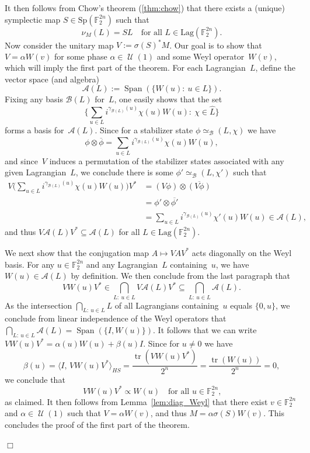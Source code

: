 \documentclass[11pt]{amsart}
\newcommand{\Lag}{\mathrm{Lag}}
\newcommand{\F}{\mathbb{F}} %
\DeclareMathOperator{\vspan}{Span} %
\newcommand{\Sp}{\mathrm{Sp}}
\DeclareMathOperator{\U}{\mathcal{U}}
\DeclareMathOperator{\tr}{tr}
\newcommand{\A}{\mathcal A}
\newcommand{\B}{\mathcal B}
\theoremstyle{plain}
\theoremstyle{definition}
\theoremstyle{remark}
\renewenvironment{proof}[1][]{
    	\begin{trivlist}
     	\item[\hspace{\labelsep}{\em\noindent Proof#1:\/}]}
     	{{\hfill$\Box$}
    	\end{trivlist}
  }
\begin{document}
\begin{proof}
It then follows from Chow's theorem (\cref{thm:chow}) that there exists a (unique) symplectic map $S\in \Sp(\F_2^{2n})$ such that
$$\nu_M(L) = SL \quad \text{for all $L\in \Lag(\F_2^{2n})$.}$$
Now consider the unitary map $V := \sigma(S)^* M$.
Our goal is to show that $V = \alpha W(v)$ for some phase $\alpha\in \U(1)$ and some Weyl operator~$W(v)$, which will imply the first part of the theorem. For each Lagrangian~$L$, define the vector space (and algebra)
$$\A(L) := \vspan(\{W(u):\: u\in L\}).$$
Fixing any basis $\B(L)$ for~$L$, one easily shows that the set
$$\bigg\{\sum_{u\in L} i^{\gamma_{\B(L)}(u)} \chi(u) W(u):\: \chi \in \widehat{L}\bigg\}$$
forms a basis for~$\A(L)$.
Since for a stabilizer state $\phi \simeq_\B (L, \chi)$ we have
$$\phi \otimes \overline{\phi} = \sum_{u\in L} i^{\gamma_{\B(L)}(u)} \chi(u) W(u),$$
and since~$V$ induces a permutation of the stabilizer states associated with any given Lagrangian~$L$, we conclude there is some $\phi' \simeq_\B (L, \chi')$ such that
\begin{align*}
    V \bigg(\sum_{u\in L} i^{\gamma_{\B(L)}(u)} \chi(u) W(u)\bigg) V^*
    &= (V\phi) \otimes \overline{(V\phi)} \\
    &= \phi' \otimes \overline{\phi'} \\
    &= \sum_{u\in L} i^{\gamma_{\B(L)}(u)} \chi'(u) W(u) \in \A(L),
\end{align*}
and thus $V \A(L) V^* \subseteq \A(L)$ for all $L\in \Lag(\F_2^{2n})$.

We next show that the conjugation map $A \mapsto VAV^*$ acts diagonally on the Weyl basis.
For any $u\in \F_2^{2n}$ and any Lagrangian~$L$ containing~$u$, we have $W(u) \in \A(L)$ by definition.
We then conclude from the last paragraph that
$$VW(u)V^* \in \bigcap_{L:\: u\in L} V\A(L)V^* \subseteq \bigcap_{L:\: u\in L} \A(L).$$
As the intersection $\bigcap_{L:\: u\in L} L$ of all Lagrangians containing~$u$ equals $\{0, u\}$, we conclude from linear independence of the Weyl operators that
$\bigcap_{L:\: u\in L} \A(L) = \vspan(\{I, W(u)\})$.
It follows that we can write $VW(u)V^* = \alpha(u) W(u) + \beta(u) I$.
Since for $u\neq 0$ we have
$$\beta(u) = \langle I,\, VW(u)V^*\rangle_{HS} = \frac{\tr(VW(u)V^*)}{2^n} = \frac{\tr(W(u))}{2^n} = 0,$$
we conclude that
$$VW(u)V^* \propto W(u) \quad \text{for all $u\in \F_2^{2n}$,}$$
as claimed.
It then follows from Lemma~\ref{lem:diag_Weyl} that there exist $v\in \F_2^{2n}$ and $\alpha\in \U(1)$ such that $V = \alpha W(v)$, and thus $M = \alpha \sigma(S)W(v)$.
This concludes the proof of the first part of the theorem.


\end{proof}
\end{document}
